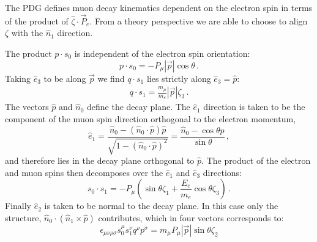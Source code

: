 The PDG defines muon decay kinematics dependent on the electron spin in terms of the product of $\hat \zeta\cdot \vec P_e$. From a theory perspective we are able to choose to align $\zeta$ with the $\hat n_1$ direction.

The product $p\cdot s_0$ is independent of the electron spin orientation:
%
\begin{equation}
p\cdot s_0=-P_\mu|\vec p|\cos\theta\, .
\end{equation}
%
Taking $\hat e_3$ to be along $\vec p$ we find $q\cdot s_1$ lies strictly along $\hat e_3=\hat p$:
%
\begin{eqnarray}
q\cdot s_1=\frac{m_\mu}{m_e}|\vec p|\zeta_3\, .
\end{eqnarray}
%
The vectors $\hat p$ and $\hat n_0$ define the decay plane. The $\hat e_1$ direction is taken to be the component of the muon spin direction orthogonal to the electron momentum,
%
\begin{equation}
\hat e_1=\frac{\hat n_0-(\hat n_0\cdot \hat p)\hat p}{\sqrt{1-(\hat n_0\cdot \hat p)^2}}=\frac{\hat n_0-\cos\theta\hat p}{\sin\theta}\, ,
\end{equation}
%
and therefore lies in the decay plane orthogonal to $\hat p$.
The product of the electron and muon spins then decomposes over the $\hat e_1$ and $\hat e_3$ directions:
%
\begin{equation}
s_0\cdot s_1=-P_\mu\left(\sin\theta \zeta_1+\frac{E_e}{m_e}\cos\theta\zeta_3\right)\, .
\end{equation}
%
Finally $\hat e_2$ is taken to be normal to the decay plane. In this case only the structure, $\hat n_0\cdot (\hat n_1\times \hat p)$ contributes, which in four vectors corresponds to:
%
\begin{equation}
\epsilon_{\mu\nu\rho\sigma}s_0^\mu s_1^\nu q^\rho p^\sigma=m_\mu P_\mu |\vec p|\sin\theta\zeta_2
\end{equation}

